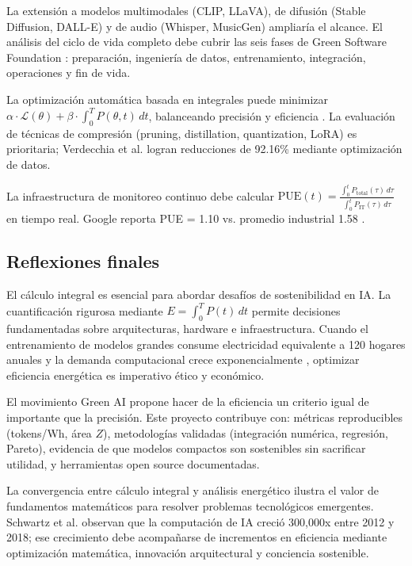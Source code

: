 La extensión a modelos multimodales (CLIP, LLaVA), de difusión (Stable Diffusion, DALL-E) y de audio (Whisper, MusicGen) ampliaría el alcance. El análisis del ciclo de vida completo debe cubrir las seis fases de Green Software Foundation \cite{greensoftware2025position}: preparación, ingeniería de datos, entrenamiento, integración, operaciones y fin de vida.

La optimización automática basada en integrales puede minimizar $\alpha \cdot \mathcal{L}(\theta) + \beta \cdot \int_0^T P(\theta, t) \, dt$, balanceando precisión y eficiencia \cite{preuveneers2020resource}. La evaluación de técnicas de compresión (pruning, distillation, quantization, LoRA) es prioritaria; Verdecchia et al. \cite{verdecchia2022datacentric} logran reducciones de 92.16\% mediante optimización de datos.

La infraestructura de monitoreo continuo debe calcular $\text{PUE}(t) = \frac{\int_0^t P_{\text{total}}(\tau) \, d\tau}{\int_0^t P_{\text{IT}}(\tau) \, d\tau}$ en tiempo real. Google reporta PUE = 1.10 vs. promedio industrial 1.58 \cite{google2025efficiency}.

\subsection{Reflexiones finales}

El cálculo integral es esencial para abordar desafíos de sostenibilidad en IA. La cuantificación rigurosa mediante $E = \int_0^T P(t) \, dt$ permite decisiones fundamentadas sobre arquitecturas, hardware e infraestructura. Cuando el entrenamiento de modelos grandes consume electricidad equivalente a 120 hogares anuales \cite{tabbakh2024sustainable} y la demanda computacional crece exponencialmente \cite{altman2024gpus}, optimizar eficiencia energética es imperativo ético y económico.

El movimiento Green AI \cite{schwartz2019green, greensoftware2025position} propone hacer de la eficiencia un criterio igual de importante que la precisión. Este proyecto contribuye con: métricas reproducibles (tokens/Wh, área $Z$), metodologías validadas (integración numérica, regresión, Pareto), evidencia de que modelos compactos son sostenibles sin sacrificar utilidad, y herramientas open source documentadas.

La convergencia entre cálculo integral y análisis energético ilustra el valor de fundamentos matemáticos para resolver problemas tecnológicos emergentes. Schwartz et al. \cite{schwartz2019green} observan que la computación de IA creció 300,000x entre 2012 y 2018; ese crecimiento debe acompañarse de incrementos en eficiencia mediante optimización matemática, innovación arquitectural y conciencia sostenible.

